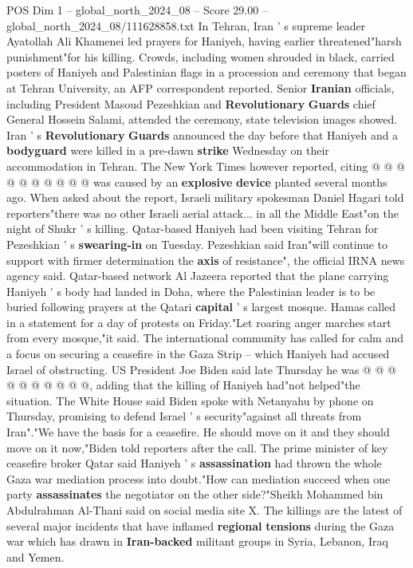 \begin{textsample}{POS Dim 1 – global\_north\_2024\_08 – Score 29.00 – global\_north\_2024\_08/111628858.txt}
In Tehran, Iran ' s supreme leader Ayatollah Ali Khamenei led prayers for Haniyeh, having earlier threatened"harsh punishment"for his killing.
Crowds, including women shrouded in black, carried posters of Haniyeh and Palestinian flags in a procession and ceremony that began at Tehran University, an AFP correspondent reported.
Senior \textbf{Iranian} officials, including President Masoud Pezeshkian and \textbf{Revolutionary} \textbf{Guards} chief General Hossein Salami, attended the ceremony, state television images showed.
Iran ' s \textbf{Revolutionary} \textbf{Guards} announced the day before that Haniyeh and a \textbf{bodyguard} were killed in a pre-dawn \textbf{strike} Wednesday on their accommodation in Tehran.
The New York Times however reported, citing @ @ @ @ @ @ @ @ @ @ was caused by an \textbf{explosive} \textbf{device} planted several months ago.
When asked about the report, Israeli military spokesman Daniel Hagari told reporters"there was no other Israeli aerial attack... in all the Middle East"on the night of Shukr ' s killing.
Qatar-based Haniyeh had been visiting Tehran for Pezeshkian ' s \textbf{swearing-in} on Tuesday.
Pezeshkian said Iran"will continue to support with firmer determination the \textbf{axis} of resistance", the official IRNA news agency said.
Qatar-based network Al Jazeera reported that the plane carrying Haniyeh ' s body had landed in Doha, where the Palestinian leader is to be buried following prayers at the Qatari \textbf{capital} ' s largest mosque.
Hamas called in a statement for a day of protests on Friday."Let roaring anger marches start from every mosque,"it said.
The international community has called for calm and a focus on securing a ceasefire in the Gaza Strip -- which Haniyeh had accused Israel of obstructing.
US President Joe Biden said late Thursday he was @ @ @ @ @ @ @ @ @ @, adding that the killing of Haniyeh had"not helped"the situation.
The White House said Biden spoke with Netanyahu by phone on Thursday, promising to defend Israel ' s security"against all threats from Iran"."We have the basis for a ceasefire.
He should move on it and they should move on it now,"Biden told reporters after the call.
The prime minister of key ceasefire broker Qatar said Haniyeh ' s \textbf{assassination} had thrown the whole Gaza war mediation process into doubt."How can mediation succeed when one party \textbf{assassinates} the negotiator on the other side?"Sheikh Mohammed bin Abdulrahman Al-Thani said on social media site X.
The killings are the latest of several major incidents that have inflamed \textbf{regional} \textbf{tensions} during the Gaza war which has drawn in \textbf{Iran-backed} militant groups in Syria, Lebanon, Iraq and Yemen.

\end{textsample}
